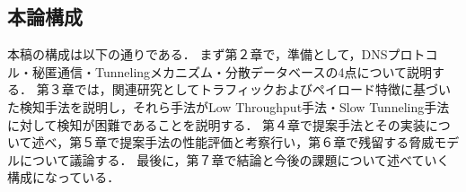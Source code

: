 \subsection{本論構成}
本稿の構成は以下の通りである．
まず第２章で，準備として，DNSプロトコル・秘匿通信・Tunnelingメカニズム・分散データベースの4点について説明する．
第３章では，関連研究としてトラフィックおよびペイロード特徴に基づいた検知手法を説明し，それら手法がLow Throughput手法・Slow Tunneling手法に対して検知が困難であることを説明する．
第４章で提案手法とその実装について述べ，第５章で提案手法の性能評価と考察行い，第６章で残留する脅威モデルについて議論する．
最後に，第７章で結論と今後の課題について述べていく構成になっている．
